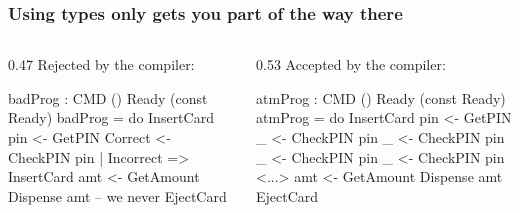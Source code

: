 \documentclass[compress,handout]{beamer}
\begin{document}
\begin{frame}[fragile]  %
  \frametitle{Using types only gets you part of the way there}

  \begin{columns}
  \begin{column}{0.47\framewidth}
    {\color{red} Rejected by the compiler:}
    \vspace*{-3mm}
    \begin{idrislisting}[basicstyle=\ttfamily\scriptsize]
badProg : CMD ()
            Ready (const Ready)
badProg =
  do InsertCard
     pin <- GetPIN
     Correct <- CheckPIN pin
       | Incorrect => InsertCard
     amt <- GetAmount
     Dispense amt 
     -- we never EjectCard
    \end{idrislisting}
  \end{column}

  \pause  %

  \hspace*{-0.6mm}
  \vrule{}

  \begin{column}{0.53\framewidth}
    {\color{orange} Accepted by the compiler:}
    \vspace*{-3mm}
    \begin{idrislisting}[basicstyle=\ttfamily\scriptsize]
atmProg : CMD ()
            Ready (const Ready)
atmProg =
  do InsertCard
     pin <- GetPIN
     _ <- CheckPIN pin
     _ <- CheckPIN pin
     _ <- CheckPIN pin
     _ <- CheckPIN pin
     <...>
     amt <- GetAmount
     Dispense amt 
     EjectCard
    \end{idrislisting}
    \vspace*{-1cm}
  \end{column}
  \end{columns}
\end{frame}
\end{document}
